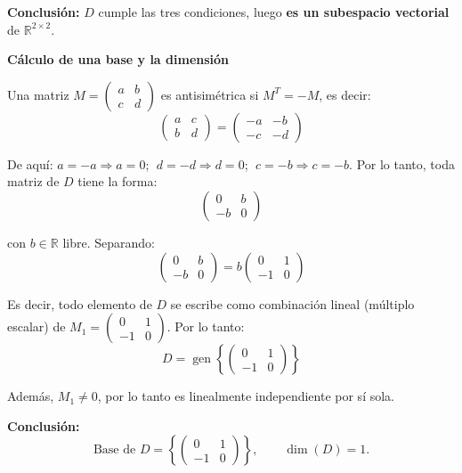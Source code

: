 \documentclass[12pt]{article}
\begin{document}
\begin{enumerate}[label=\alph*.-]
    \textbf{Conclusión:} $D$ cumple las tres condiciones, luego \textbf{es un subespacio vectorial} de $\mathbb{R}^{2\times2}$.

    \textbf{Cálculo de una base y la dimensión}

    Una matriz $M=\begin{pmatrix}a & b\\ c & d\end{pmatrix}$ es antisimétrica si $M^T=-M$, es decir:
    \[
    \begin{pmatrix}a & c\\ b & d\end{pmatrix} = \begin{pmatrix}-a & -b\\ -c & -d\end{pmatrix}
    \]

    De aquí: $a=-a \Rightarrow a=0$; $\; d=-d \Rightarrow d=0$; $\; c=-b \Rightarrow c=-b$. Por lo tanto, toda matriz de $D$ tiene la forma:
    \[
    \begin{pmatrix} 0 & b \\ -b & 0 \end{pmatrix}
    \]

    con $b\in\mathbb{R}$ libre. Separando:
    \[
    \begin{pmatrix} 0 & b \\ -b & 0 \end{pmatrix} = b\begin{pmatrix}0 & 1\\ -1 & 0\end{pmatrix}
    \]

    Es decir, todo elemento de $D$ se escribe como combinación lineal (múltiplo escalar) de $M_1=\begin{pmatrix}0&1\\-1&0\end{pmatrix}$. Por lo tanto:
    \[
    D = \operatorname{gen}\left\{ \begin{pmatrix}0&1\\-1&0\end{pmatrix} \right\}
    \]

    Además, $M_1 \neq 0$, por lo tanto es linealmente independiente por sí sola.

    \textbf{Conclusión:}
    \[
    \text{Base de } D = \left\{ \begin{pmatrix}0&1\\-1&0\end{pmatrix} \right\}, \qquad \dim(D) = 1.
    \]
\end{enumerate}
\end{document}
